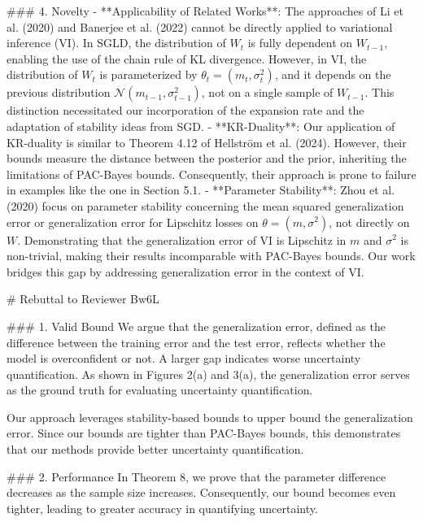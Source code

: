 \documentclass{article}
\begin{document}
\begin{markdown}
### 4. Novelty
- **Applicability of Related Works**:  
  The approaches of Li et al. (2020) and Banerjee et al. (2022) cannot be directly applied to variational inference (VI). In SGLD, the distribution of $W_t$ is fully dependent on $W_{t-1}$, enabling the use of the chain rule of KL divergence. However, in VI, the distribution of $W_t$ is parameterized by $\theta_t = (m_t, \sigma_t^2)$, and it depends on the previous distribution $\mathcal{N}(m_{t-1}, \sigma_{t-1}^2)$, not on a single sample of $W_{t-1}$. This distinction necessitated our incorporation of the expansion rate and the adaptation of stability ideas from SGD.  
- **KR-Duality**:  
  Our application of KR-duality is similar to Theorem 4.12 of Hellström et al. (2024). 
  However, their bounds measure the distance between the posterior and the prior, inheriting the limitations of PAC-Bayes bounds. Consequently, their approach is prone to failure in examples like the one in Section 5.1.  
- **Parameter Stability**:  
  Zhou et al. (2020) focus on parameter stability concerning the mean squared generalization error or generalization error for Lipschitz losses on $\theta = (m, \sigma^2)$, not directly on $W$. Demonstrating that the generalization error of VI is Lipschitz in $m$ and $\sigma^2$ is non-trivial, making their results incomparable with PAC-Bayes bounds. Our work bridges this gap by addressing generalization error in the context of VI.
\end{markdown}

\begin{markdown}
# Rebuttal to Reviewer Bw6L

### 1. Valid Bound
We argue that the generalization error, defined as the difference between the training error and the test error, reflects whether the model is overconfident or not. A larger gap indicates worse uncertainty quantification. As shown in Figures 2(a) and 3(a), the generalization error serves as the ground truth for evaluating uncertainty quantification.

Our approach leverages stability-based bounds to upper bound the generalization error. Since our bounds are tighter than PAC-Bayes bounds, this demonstrates that our methods provide better uncertainty quantification.

### 2. Performance
In Theorem 8, we prove that the parameter difference decreases as the sample size increases. Consequently, our bound becomes even tighter, leading to greater accuracy in quantifying uncertainty.

\end{markdown}
\end{document}
